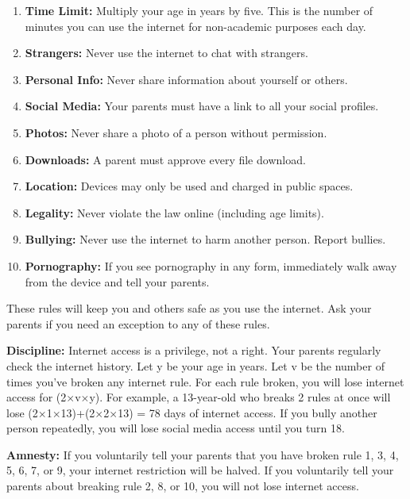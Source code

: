 \begin{enumerate}
	\item \textbf{Time Limit: } Multiply your age in years by five. This is the number of minutes you can use the internet for non-academic purposes each day.
	\item \textbf{Strangers: } Never use the internet to chat with strangers.
	\item \textbf{Personal Info: } Never share information about yourself or others.
	\item \textbf{Social Media: } Your parents must have a link to all your social profiles.
	\item \textbf{Photos: } Never share a photo of a person without permission.
	\item \textbf{Downloads: } A parent must approve every file download.
	\item \textbf{Location: } Devices may only be used and charged in public spaces.
	\item \textbf{Legality: } Never violate the law online (including age limits).
	\item \textbf{Bullying: } Never use the internet to harm another person. Report bullies.
	\item \textbf{Pornography: } If you see pornography in any form, immediately walk away from the device and tell your parents.
\end{enumerate}

These rules will keep you and others safe as you use the internet. Ask your parents if you need an exception to any of these rules.

\textbf{Discipline: } Internet access is a privilege, not a right. Your parents regularly check the internet history. Let y be your age in years. Let v be the number of times you've broken any internet rule. For each rule broken, you will lose internet access for (2$\times$v$\times$y). For example, a 13-year-old who breaks 2 rules at once will lose (2$\times$1$\times$13)+(2$\times$2$\times$13) = 78 days of internet access. If you bully another person repeatedly, you will lose social media access until you turn 18.

\textbf{Amnesty: } If you voluntarily tell your parents that you have broken rule 1, 3, 4, 5, 6, 7, or 9, your internet restriction will be halved. If you voluntarily tell your parents about breaking rule 2, 8, or 10, you will not lose internet access.